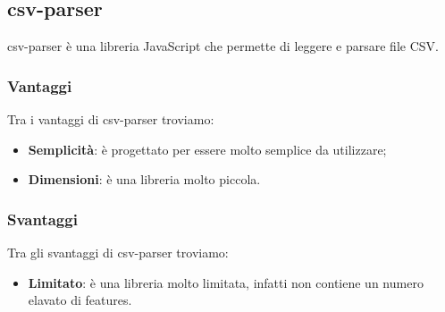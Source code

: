 \subsection*{csv-parser}
csv-parser è una libreria JavaScript che permette di leggere e parsare file CSV.

\subsubsection*{Vantaggi}
Tra i vantaggi di csv-parser troviamo:
\begin{itemize}
    \item \textbf{Semplicità}: è progettato per essere molto semplice da utilizzare;
    \item \textbf{Dimensioni}: è una libreria molto piccola.
\end{itemize}

\subsubsection*{Svantaggi}
Tra gli svantaggi di csv-parser troviamo:
\begin{itemize}
    \item \textbf{Limitato}: è una libreria molto limitata, infatti non contiene un numero elavato di features.
\end{itemize}


